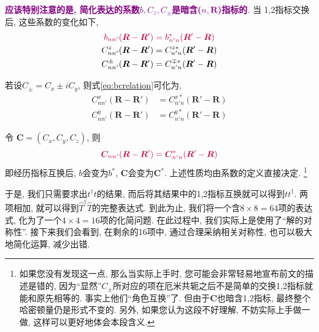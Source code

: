 \documentclass[a4paper, 12pt]{article}
\newcommand{\purple}{\textcolor{purple}}
\begin{document}
\purple{\textbf{应该特别注意的是, 简化表达的系数\(b, C_z, C_\pm\)是暗含(\(n,\bm{R}\))指标的}}. 当 1,2指标交换后, 这些系数的变化如下,
\begin{subequations}
  \begin{align}
    \purple{b_{nn'}(\bm{R}-\bm{R}')} &{}\hspace*{3pt}\purple{=b^*_{n'n}(\bm{R}'-\bm{R})}\\
    C^z_{nn'}(\bm{R}-\bm{R}') &= C^{z*}_{n'n}(\bm{R}'-\bm{R})\\
    C^\pm_{nn'}(\bm{R}-\bm{R}') &= C^{\mp{}*}_{n'n}(\bm{R}'-\bm{R}) \label{eq:bcrelation}
  \end{align}
\end{subequations}

若设\(C_{\pm} = C_x \pm iC_y\), 则式\eqref{eq:bcrelation}可化为,
\begin{subequations}
\begin{align}
  C^x_{nn'}(\bm{R}-\bm{R}') &= C^{x*}_{n'n}(\bm{R}'-\bm{R})\\
  C^y_{nn'}(\bm{R}-\bm{R}') &= C^{y*}_{n'n}(\bm{R}'-\bm{R}) 
\end{align}
\end{subequations}

令 \(\bm{C} = (C_x, C_y, C_z)\), 则
\begin{equation}
  \purple{\bm{C}_{nn'}(\bm{R}-\bm{R}') = \bm{C}^*_{n'n}(\bm{R}'-\bm{R})}
\end{equation}
即经历指标互换后, \(b\)会变为\(b^*\), \(\bm{C}\)会变为\(\bm{C}^*\). 上述性质均由系数的定义直接决定. \footnote{如果您没有发现这一点, 那么当实际上手时, 您可能会非常轻易地宣布前文的描述是错的, 因为``显然''\(C_\pm\)所对应的项在厄米共轭之后不是简单的交换1,2指标就能和原先相等的. 事实上他们``角色互换''了. 但由于\(\bm{C}\)也暗含1,2指标, 最终整个哈密顿量仍是形式不变的. 另外, 如果您认为这段不好理解, 不妨实际上手做一做, 这样可以更好地体会本段含义.} 

于是, 我们只需要求出\(t^\dagger{}t\)的结果, 而后将其结果中的1,2指标互换就可以得到\(tt^\dagger\). 两项相加, 就可以得到\(\widehat{T}^\dagger\widehat{T}\)的完整表达式. 到此为止, 我们将一个含\(8\times{}8=64\)项的表达式, 化为了一个\(4\times{}4=16\)项的化简问题. 在此过程中, 我们实际上是使用了``解的对称性''. 接下来我们会看到, 在剩余的16项中, 通过合理采纳相关对称性, 也可以极大地简化运算, 减少出错.
\end{document}

